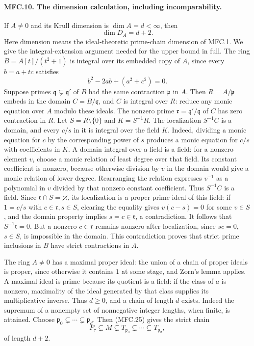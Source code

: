 \paragraph{MFC.10. The dimension calculation, including incomparability.}
If \(A\ne0\) and its Krull dimension is \(\dim A=d<\infty\), then
\[
                     \dim D_A=d+2.                       \tag{MFC.26}
\]
Here dimension means the ideal-theoretic prime-chain dimension
of MFC.1. We give the integral-extension argument needed for
the upper bound in full.
The ring \(B=A[t]/(t^2+1)\) is integral over its embedded copy
of \(A\), since every \(b=a+tc\) satisfies
\[
             b^2-2ab+(a^2+c^2)=0.                        \tag{MFC.27}
\]
Suppose primes \(\mathfrak q\subsetneq\mathfrak q'\) of \(B\)
had the same contraction \(\mathfrak p\) in \(A\).
Then \(R=A/\mathfrak p\) embeds in the domain
\(C=B/\mathfrak q\), and \(C\) is integral over \(R\):
reduce any monic equation over \(A\) modulo these ideals.
The nonzero prime \(\mathfrak r=\mathfrak q'/\mathfrak q\)
of \(C\) has zero contraction in \(R\).
Let \(S=R\setminus\{0\}\) and \(K=S^{-1}R\).
The localization \(S^{-1}C\) is a domain, and every \(c/s\)
in it is integral over the field \(K\). Indeed, dividing a
monic equation for \(c\) by the corresponding power of \(s\)
produces a monic equation for \(c/s\) with coefficients in \(K\).
A domain integral over a field is a field: for a nonzero
element \(v\), choose a monic relation of least degree over
that field. Its constant coefficient is nonzero, because
otherwise division by \(v\) in the domain would give a monic
relation of lower degree. Rearranging the relation expresses
\(v^{-1}\) as a polynomial in \(v\) divided by that nonzero
constant coefficient. Thus \(S^{-1}C\) is a field.
Since \(\mathfrak r\cap S=\varnothing\), its localization is
a proper prime ideal of this field: if \(1=c/s\) with
\(c\in\mathfrak r,s\in S\), clearing the equality gives
\(v(c-s)=0\) for some \(v\in S\), and the domain property
implies \(s=c\in\mathfrak r\), a contradiction.
It follows that \(S^{-1}\mathfrak r=0\). But a nonzero
\(c\in\mathfrak r\) remains nonzero after localization,
since \(sc=0\), \(s\in S\), is impossible in the domain.
This contradiction proves that strict prime inclusions in
\(B\) have strict contractions in \(A\).

The ring \(A\ne0\) has a maximal proper ideal: the union of
a chain of proper ideals is proper, since otherwise it
contains \(1\) at some stage, and Zorn's lemma applies.
A maximal ideal is prime because its quotient is a field:
if the class of \(a\) is nonzero, maximality of the ideal
generated by that class supplies its multiplicative inverse.
Thus \(d\ge0\), and a chain of length \(d\) exists. Indeed the
supremum of a nonempty set of nonnegative integer lengths,
when finite, is attained. Choose
\(\mathfrak p_0\subsetneq\cdots\subsetneq\mathfrak p_d\).
Then (MFC.25) gives the strict chain
\[
 P_\tau\subsetneq M\subsetneq T_{\mathfrak p_0}
       \subsetneq\cdots\subsetneq T_{\mathfrak p_d},        \tag{MFC.28}
\]
of length \(d+2\).

